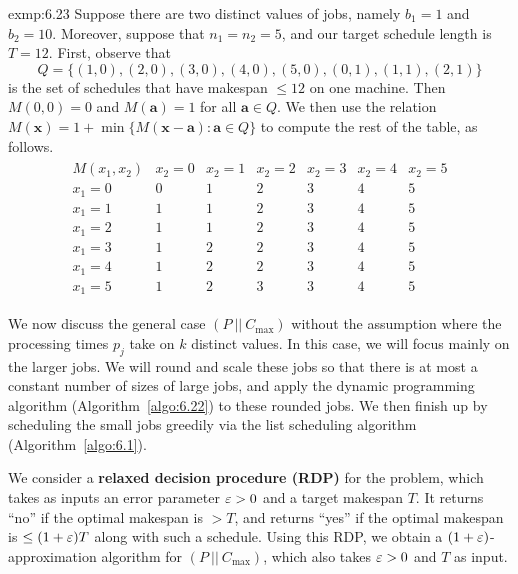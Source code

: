 \begin{exmp}{exmp:6.23}
    Suppose there are two distinct values of jobs, namely $b_1 = 1$ 
    and $b_2 = 10$. Moreover, suppose that $n_1 = n_2 = 5$, and 
    our target schedule length is $T = 12$. First, observe that 
    \[ Q = \{(1, 0), (2, 0), (3, 0), (4, 0), (5, 0), (0, 1), (1, 1), (2, 1)\} \] 
    is the set of schedules that have makespan $\leq 12$ on one machine. 
    Then $M(0, 0) = 0$ and $M(\mathbf a) = 1$ for all $\mathbf a \in Q$. 
    We then use the relation $M(\mathbf x) = 1 + \min\{M(\mathbf x - \mathbf a) 
    : \mathbf a \in Q\}$ to compute the rest of the table, as follows. 
    \begin{align*}
        \begin{array}{c|c|c|c|c|c|c} 
            M(x_1, x_2) & x_2 = 0 & x_2 = 1 & x_2 = 2 & x_2 = 3 & x_2 = 4 & x_2 = 5 \\ \hline 
            x_1 = 0 & 0 & 1 & 2 & 3 & 4 & 5 \\ \hline 
            x_1 = 1 & 1 & 1 & 2 & 3 & 4 & 5 \\ \hline 
            x_1 = 2 & 1 & 1 & 2 & 3 & 4 & 5 \\ \hline 
            x_1 = 3 & 1 & 2 & 2 & 3 & 4 & 5 \\ \hline 
            x_1 = 4 & 1 & 2 & 2 & 3 & 4 & 5 \\ \hline 
            x_1 = 5 & 1 & 2 & 3 & 3 & 4 & 5 
        \end{array}
    \end{align*}
\end{exmp}

We now discuss the general case $(P~||~C_{\max})$ without the assumption 
where the processing times $p_j$ take on $k$ distinct values. In this 
case, we will focus mainly on the larger jobs. We will round and scale 
these jobs so that there is at most a constant number of sizes of large 
jobs, and apply the dynamic programming algorithm (Algorithm~\ref{algo:6.22}) 
to these rounded jobs. We then finish up by scheduling the small jobs greedily 
via the list scheduling algorithm (Algorithm~\ref{algo:6.1}).

We consider a {\bf relaxed decision procedure (RDP)} for the problem, 
which takes as inputs an error parameter $\varepsilon > 0$ and a target makespan $T$. 
It returns ``no'' if the optimal makespan is $>T$, and returns ``yes'' 
if the optimal makespan is $\leq (1+\varepsilon)T$ along with such a schedule. 
Using this RDP, we obtain a $(1+\varepsilon)$-approximation algorithm for 
$(P~||~C_{\max})$, which also takes $\varepsilon > 0$ and $T$ as input. 

